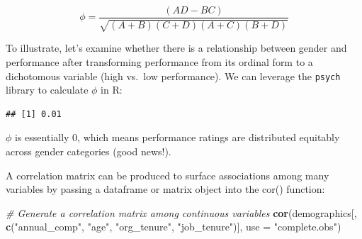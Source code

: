 \documentclass[]{book}
\newenvironment{Shaded}{\begin{snugshade}}{\end{snugshade}}
\newcommand{\CommentTok}[1]{\textcolor[rgb]{0.56,0.35,0.01}{\textit{#1}}}
\newcommand{\DataTypeTok}[1]{\textcolor[rgb]{0.13,0.29,0.53}{#1}}
\newcommand{\DecValTok}[1]{\textcolor[rgb]{0.00,0.00,0.81}{#1}}
\newcommand{\KeywordTok}[1]{\textcolor[rgb]{0.13,0.29,0.53}{\textbf{#1}}}
\newcommand{\NormalTok}[1]{#1}
\newcommand{\OperatorTok}[1]{\textcolor[rgb]{0.81,0.36,0.00}{\textbf{#1}}}
\newcommand{\StringTok}[1]{\textcolor[rgb]{0.31,0.60,0.02}{#1}}
\begin{document}
\[ \phi = {\frac {(AD-BC)}{\sqrt{(A+B)(C+D)(A+C)(B+D)}}} \]

To illustrate, let's examine whether there is a relationship between gender and performance after transforming performance from its ordinal form to a dichotomous variable (high vs.~low performance). We can leverage the \texttt{psych} library to calculate \(\phi\) in R:

\begin{Shaded}
\end{Shaded}

\begin{verbatim}
## [1] 0.01
\end{verbatim}

\(\phi\) is essentially 0, which means performance ratings are distributed equitably across gender categories (good news!).

A correlation matrix can be produced to surface associations among many variables by passing a dataframe or matrix object into the cor() function:

\begin{Shaded}
\begin{Highlighting}[]
\CommentTok{# Generate a correlation matrix among continuous variables}
\KeywordTok{cor}\NormalTok{(demographics[, }\KeywordTok{c}\NormalTok{(}\StringTok{"annual_comp"}\NormalTok{, }\StringTok{"age"}\NormalTok{, }\StringTok{"org_tenure"}\NormalTok{, }\StringTok{"job_tenure"}\NormalTok{)], }\DataTypeTok{use =} \StringTok{"complete.obs"}\NormalTok{)}
\end{Highlighting}
\end{Shaded}
\end{document}
